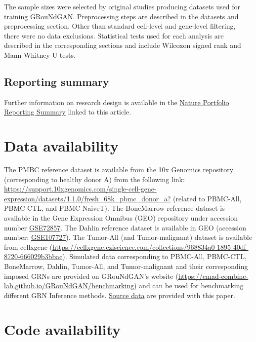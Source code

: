 The sample sizes were selected by original studies producing datasets used for training GRouNdGAN. Preprocessing steps are described in the datasets and preprocessing section. Other than standard cell-level and gene-level filtering, there were no data exclusions. Statistical tests used for each analysis are described in the corresponding sections and include Wilcoxon signed rank and Mann Whitney U tests.

\subsection*{Reporting summary}

Further information on research design is available in the 
\href{https://www.nature.com/articles/s41467-024-48516-6#MOESM7}{Nature Portfolio Reporting Summary} linked to this article.

\section*{Data availability}
\label{sec:groundgan:dataavailability}

The PMBC reference dataset is available from the 10x Genomics repository (corresponding to healthy donor A) from the following link: \url{https://support.10xgenomics.com/single-cell-gene-expression/datasets/1.1.0/fresh_68k_pbmc_donor_a?} (related to PBMC-All, PBMC-CTL, and PBMC-NaiveT). The BoneMarrow reference dataset is available in the Gene Expression Omnibus (GEO) repository under accession number \href{https://www.ncbi.nlm.nih.gov/geo/query/acc.cgi?acc=GSE72857}{GSE72857}. The Dahlin reference dataset is available in GEO (accession number: \href{https://www.ncbi.nlm.nih.gov/geo/query/acc.cgi?acc=GSE107727}{GSE107727}). The Tumor-All (and Tumor-malignant) dataset is available from cellxgene (\url{https://cellxgene.cziscience.com/collections/968834a0-1895-40df-8720-666029b3bbac}). Simulated data corresponding to PBMC-All, PBMC-CTL, BoneMarrow, Dahlin, Tumor-All, and Tumor-malignant and their corresponding imposed GRNs are provided on GRouNdGAN’s website (\url{https://emad-combine-lab.github.io/GRouNdGAN/benchmarking}) and can be used for benchmarking different GRN Inference methods. \href{https://www.nature.com/articles/s41467-024-48516-6#Sec29}{Source data} are provided with this paper.

\section*{Code availability}
\label{sec:groundgan:codeavailability}

